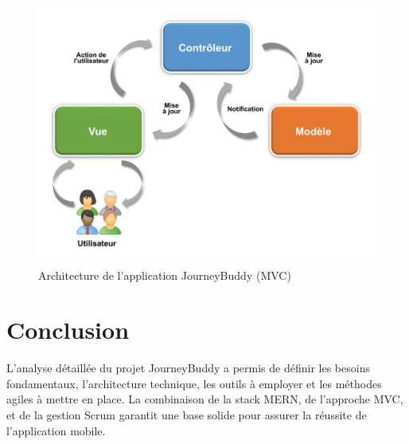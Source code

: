 \begin{figure}[H]
    \centering
    \includegraphics[width=\textwidth, height=0.3\textheight, keepaspectratio]{logos/mvc.png}
    \caption{Architecture de l'application JourneyBuddy (MVC)}
\end{figure}

\section{Conclusion}

L'analyse détaillée du projet JourneyBuddy a permis de définir les besoins fondamentaux, l’architecture technique, les outils à employer et les méthodes agiles à mettre en place. La combinaison de la stack MERN, de l’approche MVC, et de la gestion Scrum garantit une base solide pour assurer la réussite de l’application mobile.
